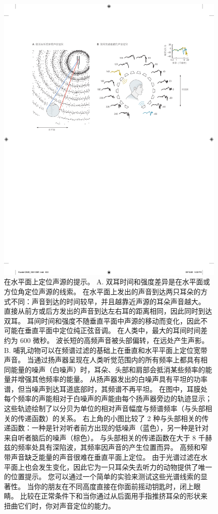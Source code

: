 \begin{figure}[htbp]
	\centering
	\includegraphics[width=1.0\linewidth]{chap28/fig_28_1}
	\caption{在水平面上定位声源的提示。
	A. 双耳时间和强度差异是在水平面或方位角定位声源的线索。
	在水平面上发出的声音到达两只耳朵的方式不同：声音到达的时间较早，并且越靠近声源的耳朵声音越大。
	直接从前方或后方发出的声音到达左右耳的距离相同，因此同时到达双耳。
	耳间时间和强度不随垂直平面中声源的移动而变化，因此不可能在垂直平面中定位纯正弦音调。
	在人类中，最大的耳间时间差约为 600 微秒。
	波长短的高频声音被头部偏转，在远处产生声影\cite{geisler1998sound}。
	B. 哺乳动物可以在频谱过滤的基础上在垂直和水平平面上定位宽带声音。
	当通过扬声器呈现在人类听觉范围内的所有频率上都具有相同能量的噪声（白噪声）时，耳朵、头部和肩部会抵消某些频率的能量并增强其他频率的能量。
	从扬声器发出的白噪声具有平坦的功率谱，但当噪声到达耳道底部时，其频谱不再平坦。
	在图中，耳膜处每个频率的声能相对于白噪声的声能由每个扬声器旁边的轨迹显示； 
	这些轨迹绘制了以分贝为单位的相对声音幅度与频谱频率（与头部相关的传递函数）的关系。
	右上角的小图比较了 2 种与头部相关的传递函数：一种是针对听者前方出现的低噪声（蓝色），另一种是针对来自听者脑后的噪声（棕色）。
	与头部相关的传递函数在大于 8 千赫兹的频率处具有深陷波，其频率因声音的产生位置而异。
	高频和窄带声音缺乏能量的声音很难在垂直平面上定位。
	由于光谱过滤在水平面上也会发生变化，因此它为一只耳朵失去听力的动物提供了唯一的位置提示。
	您可以通过一个简单的实验来测试这些光谱线索的显著性。
	当你的朋友在不同高度直接在你面前摇动钥匙时，闭上眼睛。
	比较在正常条件下和当你通过从后面用手指推挤耳朵的形状来扭曲它们时，你对声音定位的能力。}
	\label{fig:28_1}
\end{figure}


